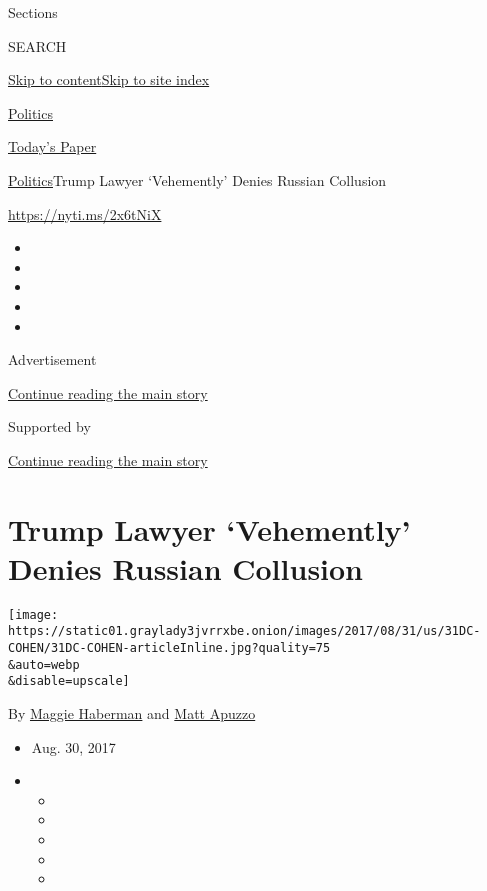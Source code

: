 Sections

SEARCH

\protect\hyperlink{site-content}{Skip to
content}\protect\hyperlink{site-index}{Skip to site index}

\href{https://www.nytimes3xbfgragh.onion/section/politics}{Politics}

\href{https://myaccount.nytimes3xbfgragh.onion/auth/login?response_type=cookie\&client_id=vi}{}

\href{https://www.nytimes3xbfgragh.onion/section/todayspaper}{Today's
Paper}

\href{/section/politics}{Politics}\textbar{}Trump Lawyer `Vehemently'
Denies Russian Collusion

\url{https://nyti.ms/2x6tNiX}

\begin{itemize}
\item
\item
\item
\item
\item
\end{itemize}

Advertisement

\protect\hyperlink{after-top}{Continue reading the main story}

Supported by

\protect\hyperlink{after-sponsor}{Continue reading the main story}

\hypertarget{trump-lawyer-vehemently-denies-russian-collusion}{%
\section{Trump Lawyer `Vehemently' Denies Russian
Collusion}\label{trump-lawyer-vehemently-denies-russian-collusion}}

\texttt{[image: https://static01.graylady3jvrrxbe.onion/images/2017/08/31/us/31DC-COHEN/31DC-COHEN-articleInline.jpg?quality=75\\\&auto=webp\\\&disable=upscale]}

By \href{http://www.nytimes3xbfgragh.onion/by/maggie-haberman}{Maggie
Haberman} and
\href{http://www.nytimes3xbfgragh.onion/by/matt-apuzzo}{Matt Apuzzo}

\begin{itemize}
\item
  Aug. 30, 2017
\item
  \begin{itemize}
  \item
  \item
  \item
  \item
  \item
  \end{itemize}
\end{itemize}

